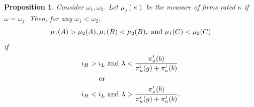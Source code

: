 \documentclass[notitlepage]{article}
\newtheorem{proposition}{Proposition}
\begin{document}
\begin{proposition}
\label{pr:dist}
Consider $\omega_{1},\omega_{2}$. Let $\mu_{j}(\kappa)$ be the measure of firms rated $\kappa$ if $\omega=\omega_{j}$. Then, for any $\omega_{1}<\omega_{2}$,
\begin{equation*}
\mu_{1}(A)>\mu_{2}(A), \mu_{1}(B)<\mu_{2}(B), \textup{ and } \mu_{1}(C)<\mu_{2}(C)
\end{equation*}
if
\begin{align*}
i_{H}>i_{L} & \textup{ and }\lambda<\frac{\pi_{\kappa}'(b)}{\pi_{\kappa}'(g)+\pi_{\kappa}'(b)}\\
\textup{or} & \\
i_{H}<i_{L} & \textup{ and }\lambda>\frac{\pi_{\kappa}'(b)}{\pi_{\kappa}'(g)+\pi_{\kappa}'(b)}.
\end{align*}
\end{proposition}
\end{document}
